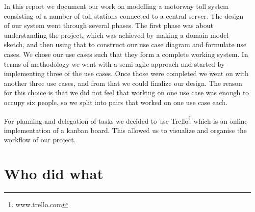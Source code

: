 
In this report we document our work on modelling a motorway toll system consisting of a number of toll stations connected to a central server. The design of our system went through several phases. The first phase was about understanding the project, which was achieved by making a domain model sketch, and then using that to construct our use case diagram and formulate use cases. We chose our use cases such that they form a complete working system. In terms of methodology we went with a semi-agile approach and started by implementing three of the use cases. Once those were completed we went on with another three use cases, and from that we could finalize our design. The reason for this choice is that we did not feel that working on one use case was enough to occupy six people, so we split into pairs that worked on one use case each.

For planning and delegation of tasks we decided to use Trello\footnote{www.trello.com} which is an online implementation of a kanban board. This allowed us to visualize and organise the workflow of our project. 
\newpage
\section{Who did what}
